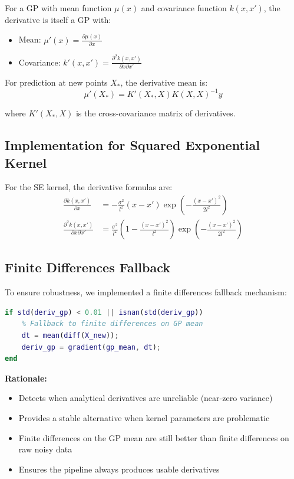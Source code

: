 \documentclass[11pt]{article}
\begin{document}
For a GP with mean function $\mu(x)$ and covariance function $k(x, x')$, the derivative is itself a GP with:
\begin{itemize}
    \item Mean: $\mu'(x) = \frac{\partial \mu(x)}{\partial x}$
    \item Covariance: $k'(x, x') = \frac{\partial^2 k(x, x')}{\partial x \partial x'}$
\end{itemize}

For prediction at new points $X_*$, the derivative mean is:
\begin{equation}
\mu'(X_*) = K'(X_*, X) K(X, X)^{-1} y
\end{equation}

where $K'(X_*, X)$ is the cross-covariance matrix of derivatives.

\subsection{Implementation for Squared Exponential Kernel}

For the SE kernel, the derivative formulas are:
\begin{align}
\frac{\partial k(x, x')}{\partial x} &= -\frac{\sigma^2}{l^2}(x - x') \exp\left(-\frac{(x-x')^2}{2l^2}\right) \\
\frac{\partial^2 k(x, x')}{\partial x \partial x'} &= \frac{\sigma^2}{l^2}\left(1 - \frac{(x-x')^2}{l^2}\right) \exp\left(-\frac{(x-x')^2}{2l^2}\right)
\end{align}

\subsection{Finite Differences Fallback}

To ensure robustness, we implemented a finite differences fallback mechanism:

\begin{lstlisting}[language=Matlab, basicstyle=\small]
if std(deriv_gp) < 0.01 || isnan(std(deriv_gp))
    % Fallback to finite differences on GP mean
    dt = mean(diff(X_new));
    deriv_gp = gradient(gp_mean, dt);
end
\end{lstlisting}

\textbf{Rationale:}
\begin{itemize}
    \item Detects when analytical derivatives are unreliable (near-zero variance)
    \item Provides a stable alternative when kernel parameters are problematic
    \item Finite differences on the GP mean are still better than finite differences on raw noisy data
    \item Ensures the pipeline always produces usable derivatives
\end{itemize}
\end{document}
